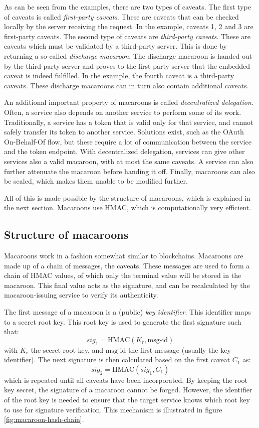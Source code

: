 As can be seen from the examples, there are two types of caveats. The first type of caveats is called \textit{first-party caveats}. These are caveats that can be checked locally by the server receiving the request. In the example, caveats 1, 2 and 3 are first-party caveats. 
The second type of caveats are \textit{third-party caveats}. These are caveats which must be validated by a third-party server. This is done by returning a so-called \textit{discharge macaroon}. The discharge macaroon is handed out by the third-party server and proves to the first-party server that the embedded caveat is indeed fulfilled. In the example, the fourth caveat is a third-party caveats. These discharge macaroons can in turn also contain additional caveats.

An additional important property of macaroons is called \textit{decentralized delegation}. Often, a service also depends on another service to perform some of its work. Traditionally, a service has a token that is valid only for that service, and cannot safely transfer its token to another service. Solutions exist, such as the OAuth On-Behalf-Of flow, but these require a lot of communication between the service and the token endpoint. With decentralized delegation, services can give other services also a valid macaroon, with at most the same caveats. A service can also further attenuate the macaroon before handing it off. Finally, macaroons can also be sealed, which makes them unable to be modified further. 

All of this is made possible by the structure of macaroons, which is explained in the next section. Macaroons use \gls{HMAC}, which is computationally very efficient.

\subsection{Structure of macaroons}
Macaroons work in a fashion somewhat similar to blockchains. Macaroons are made up of a chain of messages, the caveats. These messages are used to form a chain of \gls{HMAC} values, of which only the terminal value will be stored in the macaroon. This final value acts as the signature, and can be recalculated by the macaroon-issuing service to verify its authenticity. 

The first message of a macaroon is a (public) \textit{key identifier}. This identifier maps to a secret root key. This root key is used to generate the first signature such that: $$sig_1 = \text{HMAC}(K_r, \text{msg-id})$$
with $K_r$ the secret root key, and $\text{msg-id}$ the first message (usually the key identifier). The next signature is then calculated based on the first caveat $C_1$ as: $$sig_2 = \text{HMAC}(sig_1, C_1)$$
which is repeated until all caveats have been incorporated. By keeping the root key secret, the signature of a macaroon cannot be forged. However, the identifier of the root key is needed to ensure that the target service knows which root key to use for signature verification. This mechanism is illustrated in figure \ref{fig:macaroon-hash-chain}.

